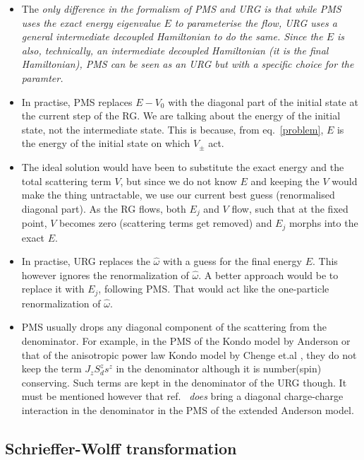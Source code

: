 \documentclass[12pt,twoside]{article}
\numberwithin{equation}{section}
\begin{document}
\begin{itemize}
\item The \it{only} difference in the formalism of PMS and URG is that while PMS uses the exact energy eigenvalue \(E\) to parameterise the flow, URG uses a general intermediate decoupled Hamiltonian to do the same. Since the \(E\) is also, technically, an intermediate decoupled Hamiltonian (it is the final Hamiltonian), PMS can be seen as an URG but with a specific choice for the paramter.
\item In practise, PMS replaces \(E-V_0\) with the diagonal part of the initial state at the current step of the RG. We are talking about the energy of the initial state, not the intermediate state. This is because, from eq.~\ref{problem}, \(E\) is the energy of the initial state on which \(V_\pm\) act. 
\item The ideal solution would have been to substitute the exact energy and the total scattering term \(V\), but since we do not know \(E\) and keeping the \(V\) would make the thing untractable, we use our current best guess (renormalised diagonal part). As the RG flows, both \(E_j\) and \(V\) flow, such that at the fixed point, \(V\) becomes zero (scattering terms get removed) and \(E_j\) morphs into the exact \(E\). 
\item In practise, URG replaces the \(\hat \omega\) with a guess for the final energy \(E\). This however ignores the renormalization of \(\hat \omega\). A better approach would be to replace it with \(E_j\), following PMS. That would act like the one-particle renormalization of \(\hat \omega\).
\item PMS usually drops any diagonal component of the scattering from the denominator. For example, in the PMS of the Kondo model by Anderson \cite{Anderson} or that of the anisotropic power law Kondo model by Chenge et.al \cite{tatha}, they do not keep the term \(J_z S_d^z s^z\) in the denominator although it is number(spin) conserving. Such terms are kept in the denominator of the URG though. It must be mentioned however that ref.~\cite{raja} \textit{does} bring a diagonal charge-charge interaction in the denominator in the PMS of the extended Anderson model.
\end{itemize}
\subsection{Schrieffer-Wolff transformation}
\end{document}
